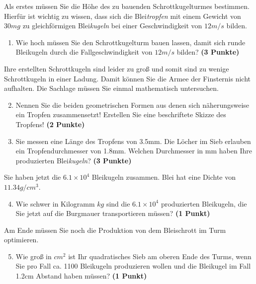 \documentclass[a4paper, 10pt]{scrartcl}\usepackage[]{graphicx}\usepackage[]{xcolor}
\begin{document}
Als erstes m{\"u}ssen Sie die H{\"o}he des zu bauenden Schrottkugelturmes
bestimmen. Hierf{\"u}r ist wichtig zu wissen, dass sich die
Blei\textit{tropfen} mit einem Gewicht von $30mg$ zu
gleichf{\"o}rmigen Blei\textit{kugeln} bei einer Geschwindigkeit von
$12m/s$ bilden.

\begin{enumerate}
\item Wie hoch m{\"u}ssen Sie den Schrottkugelturm bauen lassen, damit sich
  runde Bleikugeln durch die Fallgeschwindigkeit von $12m/s$ bilden?
  \textbf{(3 Punkte)}
\end{enumerate}

Ihre erstellten Schrottkugeln sind leider zu gro{\ss} und somit sind zu wenige
Schrottkugeln in einer Ladung. Damit k{\"o}nnen Sie die Armee der Finsternis
nicht aufhalten. Die Sachlage m{\"u}ssen Sie einmal mathematisch untersuchen.

\begin{enumerate}
  \setcounter{enumi}{1}
\item Nennen Sie die beiden geometrischen Formen aus denen sich
  n{\"a}herungsweise ein Tropfen zusammensetzt! Erstellen Sie eine beschriftete 
  Skizze des Tropfens!
  \textbf{(2 Punkte)}
\item Sie messen eine L{\"a}nge des Tropfens von 3.5mm. Die L{\"o}cher
  im Sieb erlauben ein Tropfendurchmesser von 1.8mm. Welchen
  Durchmesser in mm haben Ihre produzierten Blei\textit{kugeln}?  \textbf{(3 Punkte)}
\end{enumerate}

Sie haben jetzt die \ensuremath{6.1\times 10^{4}} Bleikugeln zusammen. Blei hat eine Dichte
von $11.34g/cm^3$.

\begin{enumerate}
  \setcounter{enumi}{3}
\item Wie schwer in Kilogramm $kg$ sind die \ensuremath{6.1\times 10^{4}} produzierten
  Bleikugeln, die Sie jetzt auf die Burgmauer transportieren m{\"u}ssen?
  \textbf{(1 Punkt)}
\end{enumerate}

Am Ende m{\"u}ssen Sie noch die Produktion von dem Bleischrott im Turm optimieren.

\begin{enumerate}
  \setcounter{enumi}{4}
\item Wie gro{\ss} in $cm^2$ ist Ihr quadratisches Sieb am oberen Ende des Turms,
  wenn Sie pro Fall ca. 1100 Bleikugeln produzieren wollen und
  die Bleikugel im Fall 1.2cm Abstand haben m{\"u}ssen?  \textbf{(1
    Punkt)}
\end{enumerate}
 
\end{document}
